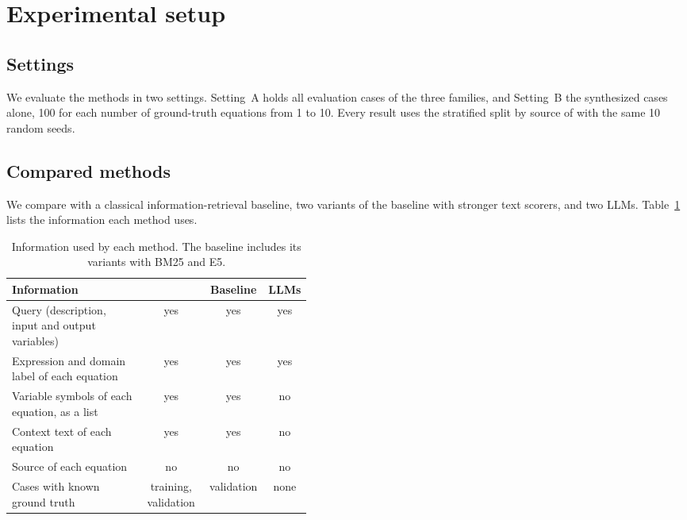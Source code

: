 \section{Experimental setup}\label{sec:setup}

\subsection{Settings}\label{sec:settings}

We evaluate the methods in two settings. Setting~A holds all \NCases{} evaluation cases of the three
families, and Setting~B the \NSynth{} synthesized cases alone, 100 for each number of ground-truth
equations from 1 to 10. Every result uses the stratified split by source of
 with the same 10 random seeds.

\subsection{Compared methods}\label{sec:compared}

We compare \ours{} with a classical information-retrieval baseline, two variants of the
baseline with stronger text scorers, and two LLMs. Table~\ref{tab:inputs} lists the information each
method uses.

\begin{table}[tbp]
\centering
\caption{Information used by each method. The baseline includes its variants with BM25 and E5.}
\label{tab:inputs}
\footnotesize
\setlength{\tabcolsep}{4pt}
\begin{tabular}{p{0.44\linewidth}ccc}
\toprule
Information & \ours{} & Baseline & LLMs \\
\midrule
Query (description, input and output variables) & yes & yes & yes \\
Expression and domain label of each equation & yes & yes & yes \\
Variable symbols of each equation, as a list & yes & yes & no \\
Context text of each equation & yes & yes & no \\
Source of each equation & no & no & no \\
Cases with known ground truth & training, validation & validation & none \\
\bottomrule
\end{tabular}
\end{table}

